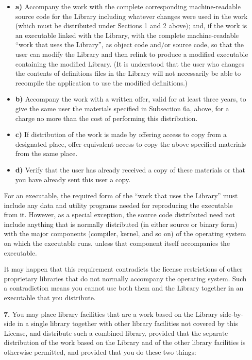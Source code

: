 \documentclass[]{article}
\providecommand{\tightlist}{%
  \setlength{\itemsep}{0pt}\setlength{\parskip}{0pt}}
\begin{document}
\begin{itemize}
\tightlist
\item
  \textbf{a)} Accompany the work with the complete corresponding
  machine-readable source code for the Library including whatever
  changes were used in the work (which must be distributed under
  Sections 1 and 2 above); and, if the work is an executable linked with
  the Library, with the complete machine-readable ``work that uses the
  Library'', as object code and/or source code, so that the user can
  modify the Library and then relink to produce a modified executable
  containing the modified Library. (It is understood that the user who
  changes the contents of definitions files in the Library will not
  necessarily be able to recompile the application to use the modified
  definitions.)
\item
  \textbf{b)} Accompany the work with a written offer, valid for at
  least three years, to give the same user the materials specified in
  Subsection 6a, above, for a charge no more than the cost of performing
  this distribution.
\item
  \textbf{c)} If distribution of the work is made by offering access to
  copy from a designated place, offer equivalent access to copy the
  above specified materials from the same place.
\item
  \textbf{d)} Verify that the user has already received a copy of these
  materials or that you have already sent this user a copy.
\end{itemize}

For an executable, the required form of the ``work that uses the
Library'' must include any data and utility programs needed for
reproducing the executable from it. However, as a special exception, the
source code distributed need not include anything that is normally
distributed (in either source or binary form) with the major components
(compiler, kernel, and so on) of the operating system on which the
executable runs, unless that component itself accompanies the
executable.

It may happen that this requirement contradicts the license restrictions
of other proprietary libraries that do not normally accompany the
operating system. Such a contradiction means you cannot use both them
and the Library together in an executable that you distribute.

\textbf{7.} You may place library facilities that are a work based on
the Library side-by-side in a single library together with other library
facilities not covered by this License, and distribute such a combined
library, provided that the separate distribution of the work based on
the Library and of the other library facilities is otherwise permitted,
and provided that you do these two things:
\end{document}
